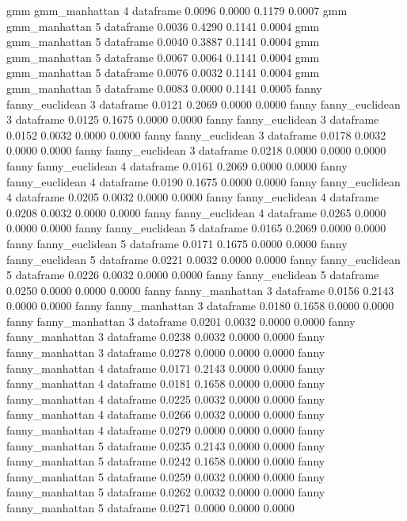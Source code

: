 \begin{Schunk}
\begin{Soutput}
     gmm   gmm_manhattan    4       dataframe    0.0096      0.0000  0.1179    0.0007
     gmm   gmm_manhattan    5       dataframe    0.0036      0.4290  0.1141    0.0004
     gmm   gmm_manhattan    5       dataframe    0.0040      0.3887  0.1141    0.0004
     gmm   gmm_manhattan    5       dataframe    0.0067      0.0064  0.1141    0.0004
     gmm   gmm_manhattan    5       dataframe    0.0076      0.0032  0.1141    0.0004
     gmm   gmm_manhattan    5       dataframe    0.0083      0.0000  0.1141    0.0005
    fanny fanny_euclidean   3       dataframe    0.0121      0.2069  0.0000    0.0000
    fanny fanny_euclidean   3       dataframe    0.0125      0.1675  0.0000    0.0000
    fanny fanny_euclidean   3       dataframe    0.0152      0.0032  0.0000    0.0000
    fanny fanny_euclidean   3       dataframe    0.0178      0.0032  0.0000    0.0000
    fanny fanny_euclidean   3       dataframe    0.0218      0.0000  0.0000    0.0000
    fanny fanny_euclidean   4       dataframe    0.0161      0.2069  0.0000    0.0000
    fanny fanny_euclidean   4       dataframe    0.0190      0.1675  0.0000    0.0000
    fanny fanny_euclidean   4       dataframe    0.0205      0.0032  0.0000    0.0000
    fanny fanny_euclidean   4       dataframe    0.0208      0.0032  0.0000    0.0000
    fanny fanny_euclidean   4       dataframe    0.0265      0.0000  0.0000    0.0000
    fanny fanny_euclidean   5       dataframe    0.0165      0.2069  0.0000    0.0000
    fanny fanny_euclidean   5       dataframe    0.0171      0.1675  0.0000    0.0000
    fanny fanny_euclidean   5       dataframe    0.0221      0.0032  0.0000    0.0000
    fanny fanny_euclidean   5       dataframe    0.0226      0.0032  0.0000    0.0000
    fanny fanny_euclidean   5       dataframe    0.0250      0.0000  0.0000    0.0000
    fanny fanny_manhattan   3       dataframe    0.0156      0.2143  0.0000    0.0000
    fanny fanny_manhattan   3       dataframe    0.0180      0.1658  0.0000    0.0000
    fanny fanny_manhattan   3       dataframe    0.0201      0.0032  0.0000    0.0000
    fanny fanny_manhattan   3       dataframe    0.0238      0.0032  0.0000    0.0000
    fanny fanny_manhattan   3       dataframe    0.0278      0.0000  0.0000    0.0000
    fanny fanny_manhattan   4       dataframe    0.0171      0.2143  0.0000    0.0000
    fanny fanny_manhattan   4       dataframe    0.0181      0.1658  0.0000    0.0000
    fanny fanny_manhattan   4       dataframe    0.0225      0.0032  0.0000    0.0000
    fanny fanny_manhattan   4       dataframe    0.0266      0.0032  0.0000    0.0000
    fanny fanny_manhattan   4       dataframe    0.0279      0.0000  0.0000    0.0000
    fanny fanny_manhattan   5       dataframe    0.0235      0.2143  0.0000    0.0000
    fanny fanny_manhattan   5       dataframe    0.0242      0.1658  0.0000    0.0000
    fanny fanny_manhattan   5       dataframe    0.0259      0.0032  0.0000    0.0000
    fanny fanny_manhattan   5       dataframe    0.0262      0.0032  0.0000    0.0000
    fanny fanny_manhattan   5       dataframe    0.0271      0.0000  0.0000    0.0000
\end{Soutput}
\end{Schunk}

